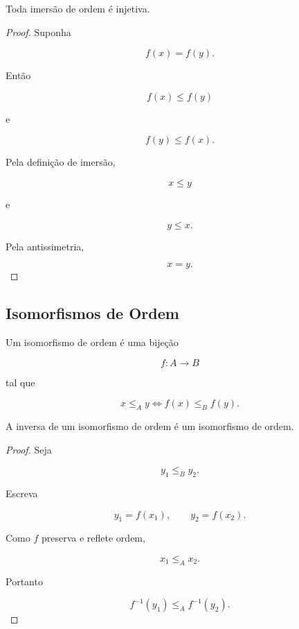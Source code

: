 \documentclass[../../main]{subfiles}
\begin{document}
\begin{prop}
	\label{prop:matematica:funcoes:ordem:imersao-injetiva}

	Toda imersão de ordem é injetiva.

\end{prop}

\begin{proof}

	Suponha

	\[
		f(x)=f(y).
	\]

	Então

	\[
		f(x)\le f(y)
	\]

	e

	\[
		f(y)\le f(x).
	\]

	Pela definição de imersão,

	\[
		x\le y
	\]

	e

	\[
		y\le x.
	\]

	Pela antissimetria,

	\[
		x=y.
	\]

\end{proof}

\subsection{Isomorfismos de Ordem}

\begin{defn}
	\label{def:matematica:funcoes:ordem:isomorfismo}

	Um isomorfismo de ordem é uma bijeção

	\[
		f:A\to B
	\]

	tal que

	\[
		x\le_A y
		\iff
		f(x)\le_B f(y).
	\]

\end{defn}

\begin{prop}
	\label{prop:matematica:funcoes:ordem:isomorfismo-inversa}

	A inversa de um isomorfismo de ordem é um isomorfismo de ordem.

\end{prop}

\begin{proof}

	Seja

	\[
		y_1\le_B y_2.
	\]

	Escreva

	\[
		y_1=f(x_1),
		\qquad
		y_2=f(x_2).
	\]

	Como \(f\) preserva e reflete ordem,

	\[
		x_1\le_A x_2.
	\]

	Portanto

	\[
		f^{-1}(y_1)
		\le_A
		f^{-1}(y_2).
	\]

\end{proof}
\end{document}
